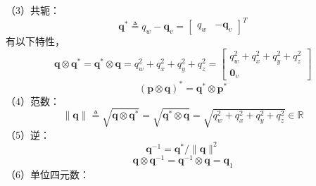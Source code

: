 （3）共轭：
\begin{equation}
\label{eqn:2.33}
\mathbf{q}^{*} \triangleq q_{w}-\mathbf{q}_{v}=\left[ \begin{array}{cc}{q_{w}} & {-\mathbf{q}_{v}}\end{array}\right]^T
\end{equation}
有以下特性，
\begin{equation}
\label{eqn:2.34}
\mathbf{q} \otimes \mathbf{q}^{*}=\mathbf{q}^{*} \otimes \mathbf{q}=q_{w}^{2}+q_{x}^{2}+q_{y}^{2}+q_{z}^{2}=\left[ \begin{array}{c}{q_{w}^{2}+q_{x}^{2}+q_{y}^{2}+q_{z}^{2}} \\ {\mathbf{0}_{v}}\end{array}\right]
\end{equation}
\begin{equation}
\label{eqn:2.35}
(\mathbf{p} \otimes \mathbf{q})^{*}=\mathbf{q}^{*} \otimes \mathbf{p}^{*}
\end{equation}
（4）范数：
\begin{equation}
\label{eqn:2.36}
\|\mathbf{q}\| \triangleq \sqrt{\mathbf{q} \otimes \mathbf{q}^{*}}=\sqrt{\mathbf{q}^{*} \otimes \mathbf{q}}=\sqrt{q_{w}^{2}+q_{x}^{2}+q_{y}^{2}+q_{z}^{2}} \in \mathbb{R}
\end{equation}
（5）逆：
\begin{equation}
\label{eqn:2.37}
\mathbf{q}^{-1}=\mathbf{q}^{*} /\|\mathbf{q}\|^{2}
\end{equation}
\begin{equation}
\label{eqn:2.38}
\mathbf{q} \otimes \mathbf{q}^{-1}=\mathbf{q}^{-1} \otimes \mathbf{q}=\mathbf{q}_{1}
\end{equation}
（6）单位四元数：

